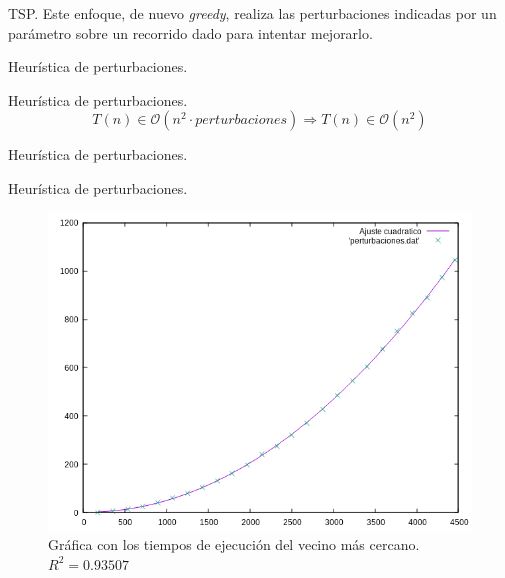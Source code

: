 \documentclass[10pt, xcolor=table]{beamer}
\begin{document}
\begin{frame}[fragile]{TSP. }
Este enfoque, de nuevo \textit{greedy}, realiza las perturbaciones indicadas por un parámetro sobre un recorrido dado para intentar mejorarlo. 
\end{frame}

\begin{frame}[fragile]{Heurística de perturbaciones. }
\begin{center}
\scalebox{0.7}{

}
\end{center}
\end{frame}

\begin{frame}[fragile]{Heurística de perturbaciones. }
\[
	T(n) \in \mathcal{O}(n^2 \cdot perturbaciones) \Rightarrow T(n) \in \mathcal{O}(n^2)
\]
\end{frame}

\begin{frame}[fragile]{Heurística de perturbaciones. }
\begin{table}[h!]
 	\centering
 	\footnotesize
 	\caption{Experiencia empírica de perturbaciones}
 \end{table}
\end{frame}

\begin{frame}[fragile]{Heurística de perturbaciones. }
\begin{figure}[h!]
 	\centering
 	\includegraphics[scale=0.5]{./Images/perturbaciones.png}
 	\caption{Gráfica con los tiempos de ejecución del vecino más cercano. \(R^2 = 0.93507\)}
 \end{figure}
\end{frame}
\end{document}
